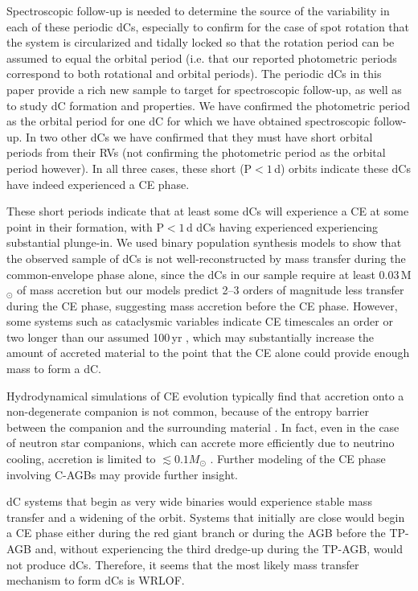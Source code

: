 \documentclass[twocolumn]{aastex631}
\begin{document}
Spectroscopic follow-up is needed to determine the source of the variability in each of these periodic dCs, especially to confirm for the case of spot rotation that the system is circularized and tidally locked so that the rotation period can be assumed to equal the orbital period (i.e. that our reported photometric periods correspond to both rotational and orbital periods). The periodic dCs in this paper provide a rich new sample to target for spectroscopic follow-up, as well as to study dC formation and properties. We have confirmed the photometric period as the orbital period for one dC for which we have obtained spectroscopic follow-up. In two other dCs we have confirmed that they must have short orbital periods from their RVs (not confirming the photometric period as the orbital period however). In all three cases, these short (P$< 1$\,d) orbits indicate these dCs have indeed experienced a CE phase.

These short periods indicate that at least some dCs will experience a CE at some point in their formation, with P$< 1$\,d dCs having experienced experiencing substantial plunge-in. We used binary population synthesis models to show that the observed sample of dCs is not well-reconstructed by mass transfer during the common-envelope phase alone, since the dCs in our sample require at least 0.03\,M$_\odot$ of mass accretion but our models predict 2--3 orders of magnitude less transfer during the CE phase, suggesting mass accretion before the CE phase. However, some systems such as cataclysmic variables indicate CE timescales an order or two longer \citep{Michaely2019, Igoshev2020} than our assumed 100\,yr \citep[based on][]{Ricker2008, Igoshev2020}, which may substantially increase the amount of accreted material to the point that the CE alone could provide enough mass to form a dC. 

Hydrodynamical simulations of CE evolution typically find that accretion onto a non-degenerate companion is not common, because of the entropy barrier between the companion and the surrounding material \citep[e.g.][for a review]{Ivanova2013}. In fact, even in the case of neutron star companions, which can accrete more efficiently due to neutrino cooling, accretion is limited to $\lesssim0.1M_{\odot}$
\citep{MacLeod2015}. Further modeling of the CE phase involving C-AGBs may provide further insight.

dC systems that begin as very wide binaries would experience stable mass transfer and a widening of the orbit. Systems that initially are close would begin a CE phase either during the red giant branch or during the AGB before the TP-AGB and, without experiencing the third dredge-up during the TP-AGB, would not produce dCs. Therefore, it seems that the most likely mass transfer mechanism to form dCs is WRLOF. 
\end{document}
